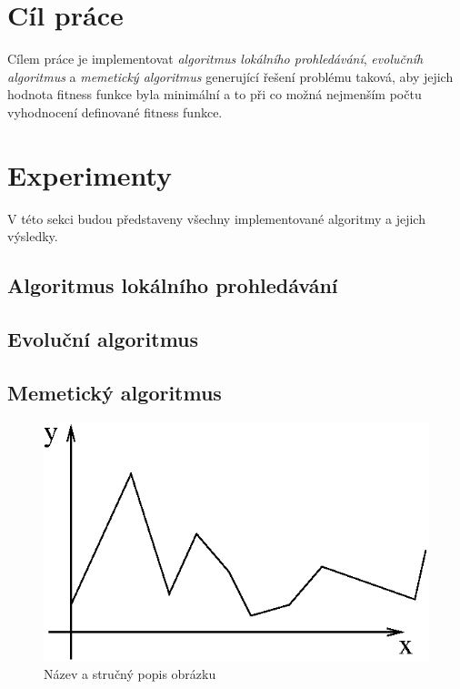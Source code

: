 \documentclass[journal]{IEEEtrancz}
\begin{document}
\section{Cíl práce}
Cílem práce je implementovat \textit{algoritmus lokálního prohledávání}, \textit{evolučníh algoritmus} a \textit{memetický algoritmus} generující řešení problému taková, aby jejich hodnota fitness funkce byla minimální a to při co možná nejmenším počtu vyhodnocení definované fitness funkce. 

\section{Experimenty}
V této sekci budou představeny všechny implementované algoritmy a jejich výsledky. 


% 

\subsection{Algoritmus lokálního prohledávání}

\subsection{Evoluční algoritmus}

\subsection{Memetický algoritmus}





\begin{figure}[ht]
  \centering
    \includegraphics{figure}
      \caption{Název a stručný popis obrázku}
    \label{fig:exfig}
\end{figure}
\end{document}
